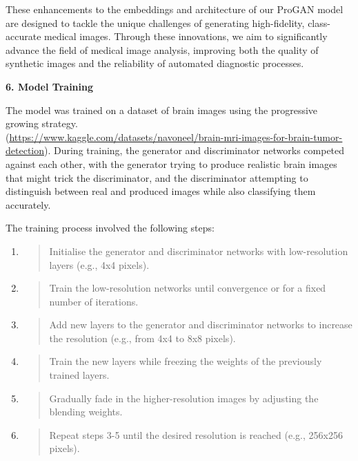 \documentclass[
]{article}
\begin{document}
These enhancements to the embeddings and architecture of our ProGAN
model are designed to tackle the unique challenges of generating
high-fidelity, class-accurate medical images. Through these innovations,
we aim to significantly advance the field of medical image analysis,
improving both the quality of synthetic images and the reliability of
automated diagnostic processes.

\textbf{6. Model Training}

The model was trained on a dataset of brain images using the progressive
growing strategy.\\
(\href{https://www.kaggle.com/datasets/navoneel/brain-mri-images-for-brain-tumor-detection}{\uline{https://www.kaggle.com/datasets/navoneel/brain-mri-images-for-brain-tumor-detection}}).
During training, the generator and discriminator networks competed
against each other, with the generator trying to produce realistic brain
images that might trick the discriminator, and the discriminator
attempting to distinguish between real and produced images while also
classifying them accurately.

The training process involved the following steps:

\begin{enumerate}
\def\labelenumi{\arabic{enumi}.}
\item
  \begin{quote}
  Initialise the generator and discriminator networks with
  low-resolution layers (e.g., 4x4 pixels).
  \end{quote}
\item
  \begin{quote}
  Train the low-resolution networks until convergence or for a fixed
  number of iterations.
  \end{quote}
\item
  \begin{quote}
  Add new layers to the generator and discriminator networks to increase
  the resolution (e.g., from 4x4 to 8x8 pixels).
  \end{quote}
\item
  \begin{quote}
  Train the new layers while freezing the weights of the previously
  trained layers.
  \end{quote}
\item
  \begin{quote}
  Gradually fade in the higher-resolution images by adjusting the
  blending weights.
  \end{quote}
\item
  \begin{quote}
  Repeat steps 3-5 until the desired resolution is reached (e.g.,
  256x256 pixels).
  \end{quote}
\end{enumerate}
\end{document}
